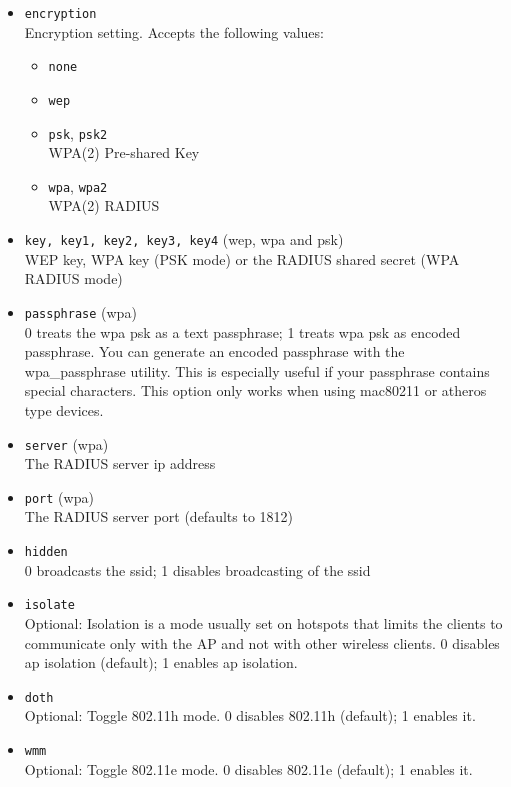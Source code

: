\begin{itemize}
    \item \texttt{encryption} \\
        Encryption setting. Accepts the following values:

        \begin{itemize}
	    \item \texttt{none}
	    \item \texttt{wep}
            \item \texttt{psk}, \texttt{psk2} \\
                WPA(2) Pre-shared Key

            \item \texttt{wpa}, \texttt{wpa2} \\
                WPA(2) RADIUS
        \end{itemize}

    \item \texttt{key, key1, key2, key3, key4} (wep, wpa and psk) \\
        WEP key, WPA key (PSK mode) or the RADIUS shared secret (WPA RADIUS mode)

    \item \texttt{passphrase} (wpa) \\
        0 treats the wpa psk as a text passphrase; 1 treats wpa psk as
        encoded passphrase. You can generate an encoded passphrase with
        the wpa\_passphrase utility. This is especially useful if your
        passphrase contains special characters. This option only works
        when using mac80211 or atheros type devices.

    \item \texttt{server} (wpa) \\
        The RADIUS server ip address

    \item \texttt{port} (wpa) \\
        The RADIUS server port (defaults to 1812)

    \item \texttt{hidden} \\
        0 broadcasts the ssid; 1 disables broadcasting of the ssid

    \item \texttt{isolate} \\
        Optional: Isolation is a mode usually set on hotspots that limits the clients to communicate only with the AP and not with other wireless clients.
        0 disables ap isolation (default); 1 enables ap isolation.

    \item \texttt{doth} \\
        Optional: Toggle 802.11h mode.
        0 disables 802.11h (default); 1 enables it.

    \item \texttt{wmm} \\
        Optional: Toggle 802.11e mode.
        0 disables 802.11e (default); 1 enables it.

\end{itemize}


